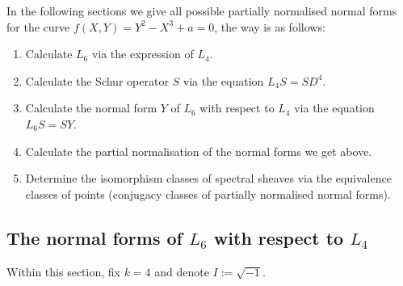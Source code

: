\documentclass[11pt]{article}
\theoremstyle{definition}
\theoremstyle{plain}
\numberwithin{equation}{section}
\begin{document}
In the following sections we give all possible partially normalised normal forms for the curve  $f(X,Y)=Y^2-X^3+a=0$, the way is as follows:
\begin{enumerate}
	\item Calculate $L_6$ via the expression of $L_4$.
	\item Calculate the  Schur operator $S$ via the equation $L_4S=SD^4$.
	\item Calculate  the normal form $Y$ of $L_6$ with respect to $L_4$ via the equation $L_6S=SY$.
	\item Calculate the partial normalisation of the normal forms we get above.
	\item Determine the isomorphism classes of spectral sheaves via the equivalence classes of points (conjugacy classes of partially normalised normal forms).
\end{enumerate}



\subsection{The normal forms of $L_6$ with respect to $L_4$}
\label{S:normal_form_ofL_6}

Within this section, fix $k=4$ and denote $I:=\sqrt{-1}$.  
\end{document}
